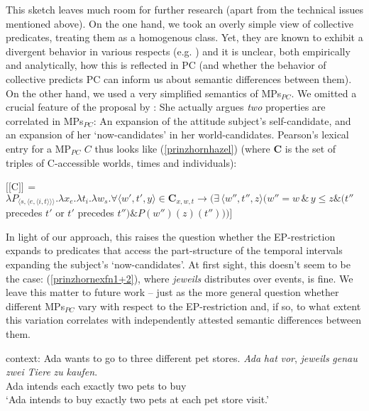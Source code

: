 \documentclass[output=paper,colorlinks,citecolor=brown,
]{langscibook}
\newcommand{\sem}[2]{\mbox{$[\![${#2}$]\!]^{#1}$}} %
\begin{document}
This sketch leaves much room for further research (apart from the technical issues mentioned above). On the one hand, we took an overly simple view of collective predicates, treating them as a homogenous class. Yet, they are known to exhibit a divergent behavior in various respects (e.g. \citealt{Dowty:1986, Landman:2000}) and it is unclear, both empirically and analytically, how this is reflected in PC (and whether the behavior of collective predicts PC can inform us about  semantic differences between them).
On the other hand,  we used a very simplified semantics of MPs$_{PC}$. We omitted a crucial feature of the proposal by \cite{Pearson:2016}: She actually 
 argues \textit{two} properties are correlated in  MPs$_{PC}$: An expansion of the attitude subject's self-candidate, and an expansion of her `now-candidates' in her world-candidates. Pearson's lexical entry for a MP$_{PC}$ $C$ thus looks like (\ref{prinzhornhazel}) (where \textbf{C} is the set of triples of C-accessible worlds, times and individuals):

\ea \sem{}{C} = $\lambda P_{\langle s, \langle e, \langle i,t \rangle \rangle \rangle}. \lambda x_{e}. \lambda t_{i}. \lambda w_{s}. \forall \langle w',t',y \rangle \in \textbf{C}_{x,w,t} \rightarrow (\exists\, \langle w'', t'', z \rangle (w'' = w \, \& \, y \le z \& (t''$ precedes $t'$ or $t'$ precedes $t'') \& P(w'')(z)(t'')))]$
 \label{prinzhornhazel}\z  
 
In light of our approach, this raises the question whether the EP-restriction expands to predicates that access the part-structure of the temporal intervals expanding the subject's `now-candidates'. At first sight, this doesn't seem to be the case:   (\ref{prinzhornexfn1+2}), where \textit{jeweils} distributes over events, is fine. We leave this matter to future work -- just as the more general question  whether different MPs$_{PC}$ vary with respect to the EP-restriction and, if so, to what extent this variation correlates with independently attested semantic differences between them.
 
\ea \label{prinzhornexfn1+2}
\ea \label{prinzhornexfn1} {\sc context: } Ada wants to go to three different pet stores.
\ex \gll \textit{Ada} \textit{hat} \textit{vor}, \textit{jeweils} \textit{genau} \textit{zwei} \textit{Tiere} \textit{zu} \textit{kaufen}.\\
   Ada intends {} each exactly two pets to buy \\
\glt `Ada intends to buy exactly two pets at each pet store visit.' \label{prinzhornexfn2}
\z \z
\end{document}
